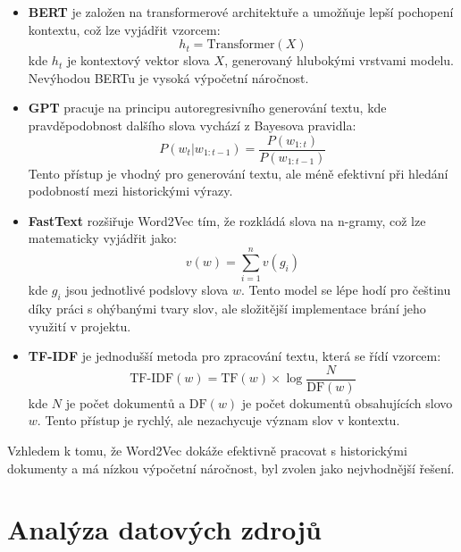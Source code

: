 \documentclass[czech, ba, kiv, he]{fasthesis}
\begin{document}
\begin{itemize}
    \item \textbf{BERT} je založen na transformerové architektuře a umožňuje lepší pochopení kontextu, což lze vyjádřit vzorcem:
    \begin{equation}
        h_t = \text{Transformer}(X)
    \end{equation}
    kde \( h_t \) je kontextový vektor slova \( X \), generovaný hlubokými vrstvami modelu. Nevýhodou BERTu je vysoká výpočetní náročnost.

    \item \textbf{GPT} pracuje na principu autoregresivního generování textu, kde pravděpodobnost dalšího slova vychází z Bayesova pravidla:
    \begin{equation}
        P(w_t | w_{1:t-1}) = \frac{P(w_{1:t})}{P(w_{1:t-1})}
    \end{equation}
    Tento přístup je vhodný pro generování textu, ale méně efektivní při hledání podobností mezi historickými výrazy.

    \item \textbf{FastText} rozšiřuje Word2Vec tím, že rozkládá slova na n-gramy, což lze matematicky vyjádřit jako:
    \begin{equation}
        v(w) = \sum_{i=1}^{n} v(g_i)
    \end{equation}
    kde \( g_i \) jsou jednotlivé podslovy slova \( w \). Tento model se lépe hodí pro češtinu díky práci s ohýbanými tvary slov, ale složitější implementace brání jeho využití v projektu.

    \item \textbf{TF-IDF} je jednodušší metoda pro zpracování textu, která se řídí vzorcem:
    \begin{equation}
        \text{TF-IDF}(w) = \text{TF}(w) \times \log \frac{N}{\text{DF}(w)}
    \end{equation}
    kde \( N \) je počet dokumentů a \( \text{DF}(w) \) je počet dokumentů obsahujících slovo \( w \). Tento přístup je rychlý, ale nezachycuje význam slov v kontextu.
\end{itemize}

Vzhledem k tomu, že Word2Vec dokáže efektivně pracovat s historickými dokumenty a má nízkou výpočetní náročnost, byl zvolen jako nejvhodnější řešení.

\section{Analýza datových zdrojů}
\end{document}
